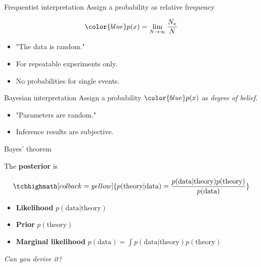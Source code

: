 \documentclass[
aspectratio=169,
14pt,
professionalfonts
]{beamer}
\begin{document}
\begin{frame}{Frequentist interpretation}
    Assign a probability as relative frequency

        $$ \color{blue}
        p(x) = \lim_{N\to\infty} \frac{N_x}{N}
        $$

        \begin{itemize}
            \item "The data is random."
            \item For repeatable experiments only.
            \item No probabilities for single events.
        \end{itemize}
\end{frame}

\begin{frame}{Bayesian interpretation}
    Assign a probability $\color{blue} p(x)$ as \textit{degree of belief}.
    \begin{itemize}
        \item "Parameters are random."
        \item Inference results are subjective.
    \end{itemize}
\end{frame}

\begin{frame}{Bayes' theorem}

The \textbf{posterior} is

$$
\tcbhighmath[colback=yellow]{
p(\text{theory} | \text{data}) = \frac{p(\text{data}|\text{theory}) p(\text{theory})}{p(\text{data})}
}
$$

\begin{itemize}
    \item \textbf{Likelihood} $p(\text{data}|\text{theory})$
    \item \textbf{Prior} $p(\text{theory})$
    \item \textbf{Marginal likelihood} ${p(\text{data}) = \int p(\text{data}|\text{theory}) p(\text{theory})}$
\end{itemize}
\begin{flushright}
    \textit{Can you derive it?}
\end{flushright}
\end{frame}
\end{document}
